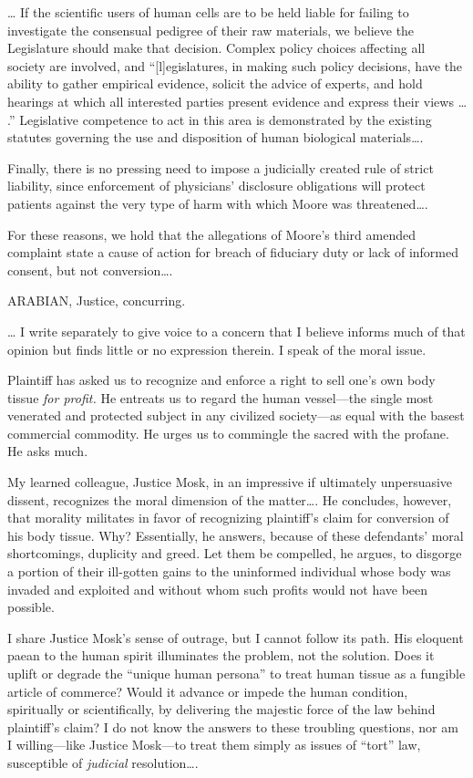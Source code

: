 {\dots} If the scientific users of human cells are to be held liable for failing
to investigate the consensual pedigree of their raw materials, we believe the
Legislature should make that decision. Complex policy choices affecting all
society are involved, and ``[l]egislatures, in making such policy decisions,
have the ability to gather empirical evidence, solicit the advice of experts,
and hold hearings at which all interested parties present evidence and express
their views {\dots} .'' Legislative competence to act in this area is
demonstrated by the existing statutes governing the use and disposition of
human biological materials{\dots}.

Finally, there is no pressing need to impose a judicially created rule of strict
liability, since enforcement of physicians' disclosure obligations will protect
patients against the very type of harm with which Moore was threatened{\dots}.

For these reasons, we hold that the allegations of Moore's third amended
complaint state a cause of action for breach of fiduciary duty or lack of
informed consent, but not conversion{\dots}. 

ARABIAN, Justice, concurring.

{\dots} I write separately to give voice to a concern that I believe informs
much of that opinion but finds little or no expression therein. I speak of the
moral issue.

Plaintiff has asked us to recognize and enforce a right to sell one's own body
tissue \textit{for profit.} He entreats us to regard the human vessel---the
single most venerated and protected subject in any civilized society---as
equal with the basest commercial commodity. He urges us to commingle the sacred
with the profane. He asks much.

My learned colleague, Justice Mosk, in an impressive if ultimately unpersuasive
dissent, recognizes the moral dimension of the matter{\dots}. He concludes,
however, that morality militates in favor of recognizing plaintiff's claim for
conversion of his body tissue. Why? Essentially, he answers, because of these
defendants' moral shortcomings, duplicity and greed. Let them be compelled, he
argues, to disgorge a portion of their ill-gotten gains to the uninformed
individual whose body was invaded and exploited and without whom such profits
would not have been possible.

I share Justice Mosk's sense of outrage, but I cannot follow its path. His
eloquent paean to the human spirit illuminates the problem, not the solution.
Does it uplift or degrade the ``unique human persona'' to treat human tissue as
a fungible article of commerce? Would it advance or impede the human condition,
spiritually or scientifically, by delivering the majestic force of the law
behind plaintiff's claim? I do not know the answers to these troubling
questions, nor am I willing---like Justice Mosk---to treat them simply as
issues of ``tort'' law, susceptible of \textit{judicial} resolution{\dots}.

